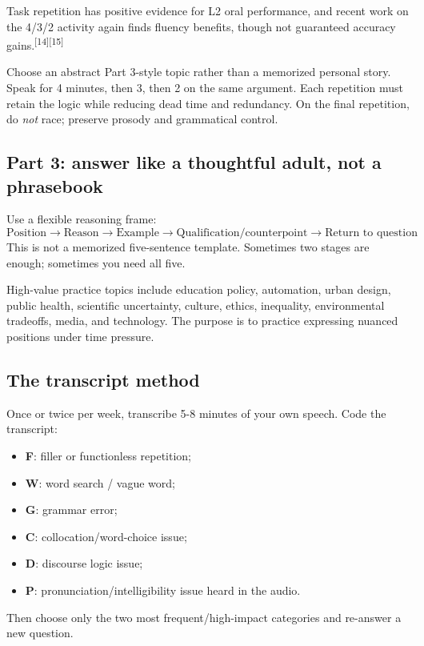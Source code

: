 \documentclass[11pt,a4paper]{article}
\newcommand{\src}[1]{\textsuperscript{[#1]}}
\begin{document}
Task repetition has positive evidence for L2 oral performance, and recent work on the 4/3/2 activity again finds fluency benefits, though not guaranteed accuracy gains.\src{14}\src{15}

\begin{practicebox}
Choose an abstract Part 3-style topic rather than a memorized personal story. Speak for 4 minutes, then 3, then 2 on the same argument. Each repetition must retain the logic while reducing dead time and redundancy. On the final repetition, do \emph{not} race; preserve prosody and grammatical control.
\end{practicebox}

\subsection{Part 3: answer like a thoughtful adult, not a phrasebook}
Use a flexible reasoning frame:
\[
\text{Position} \rightarrow \text{Reason} \rightarrow \text{Example} \rightarrow \text{Qualification/counterpoint} \rightarrow \text{Return to question}
\]
This is not a memorized five-sentence template. Sometimes two stages are enough; sometimes you need all five.

High-value practice topics include education policy, automation, urban design, public health, scientific uncertainty, culture, ethics, inequality, environmental tradeoffs, media, and technology. The purpose is to practice expressing nuanced positions under time pressure.

\subsection{The transcript method}
Once or twice per week, transcribe 5-8 minutes of your own speech. Code the transcript:
\begin{itemize}
\item \textbf{F}: filler or functionless repetition;
\item \textbf{W}: word search / vague word;
\item \textbf{G}: grammar error;
\item \textbf{C}: collocation/word-choice issue;
\item \textbf{D}: discourse logic issue;
\item \textbf{P}: pronunciation/intelligibility issue heard in the audio.
\end{itemize}
Then choose only the two most frequent/high-impact categories and re-answer a new question.
\end{document}
